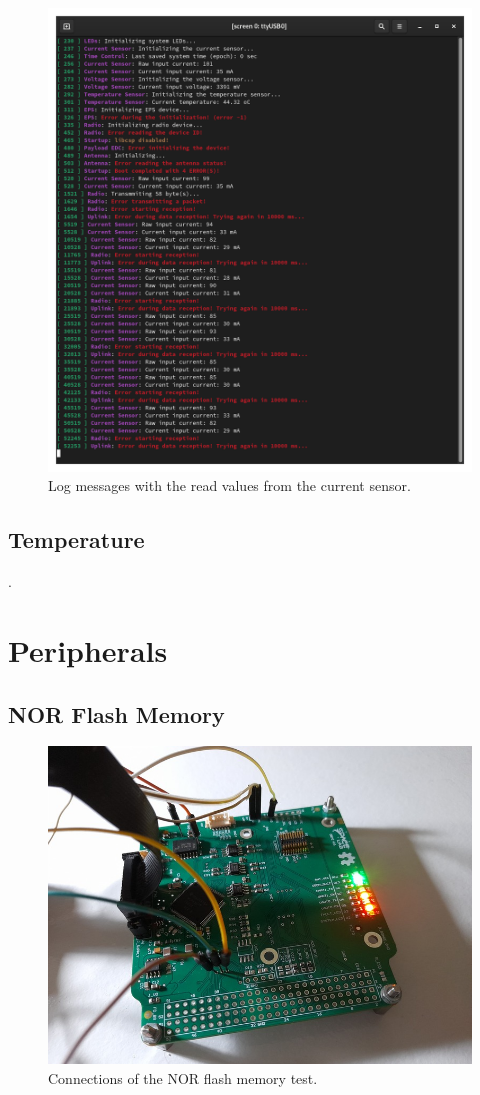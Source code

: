 \begin{figure}[!ht]
    \begin{center}
        \includegraphics[width=0.8\columnwidth]{figures/v05/log-current-sensor.png}
        \caption{Log messages with the read values from the current sensor.}
        \label{fig:log-current-sensor}
    \end{center}
\end{figure}

\subsection{Temperature}

.

\section{Peripherals}

\subsection{NOR Flash Memory}

\begin{figure}[!ht]
    \begin{center}
        \includegraphics[width=0.7\columnwidth]{figures/v05/test-nor-memory.jpg}
        \caption{Connections of the NOR flash memory test.}
        \label{fig:test-nor-memory}
    \end{center}
\end{figure}

